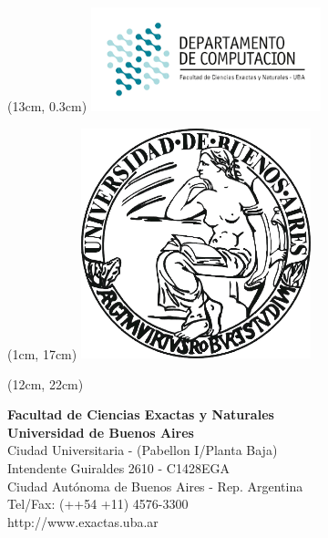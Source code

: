 \documentclass{article}
\begin{document}
\begin{textblock*}{16cm}(13cm, 0.3cm)
    \includegraphics[width=0.5\textwidth]{dc_logo.png}
\end{textblock*}

\begin{textblock*}{17cm} (1cm, 17cm)
    {
    \includegraphics[width=0.5\textwidth]{uba_logo.jpg}
    }
\end{textblock*}

\begin{textblock*}{40cm} (12cm, 22cm)
    {\raggedright
    \textbf{Facultad de Ciencias Exactas y Naturales}\\
    \textbf{Universidad de Buenos Aires}\\
    Ciudad Universitaria - (Pabellon I/Planta Baja)\\
    Intendente Guiraldes 2610 - C1428EGA\\
    Ciudad Autónoma de Buenos Aires - Rep. Argentina\\
    Tel/Fax: (++54 +11) 4576-3300\\
    http://www.exactas.uba.ar
    }
\end{textblock*}
\end{document}

